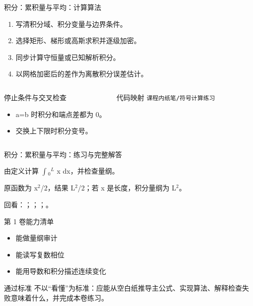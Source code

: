 \begin{frame}[t]{积分：累积量与平均：计算算法}
\footnotesize
{}\begin{enumerate}
\item 写清积分域、积分变量与边界条件。
\item 选择矩形、梯形或高斯求积并逐级加密。
\item 同步计算守恒量或已知解析积分。
\item 以网格加密后的差作为离散积分误差估计。
\end{enumerate}\begin{columns}[T,onlytextwidth]
\begin{block}{停止条件与交叉检查}\scriptsize\begin{itemize}
\item[\CheckMark] a=b 时积分和端点差都为 0。
\item[\CheckMark] 交换上下限时积分变号。
\end{itemize}\end{block}
\begin{block}{代码映射}
\scriptsize \texttt{课程内纸笔/\allowbreak{}符号计算练习}
\end{block}\end{columns}\end{frame}

\begin{frame}[t]{积分：累积量与平均：练习与完整解答}
\footnotesize
\begin{block}{}由定义计算 \ensuremath{\int}\ensuremath{_{0}}\ensuremath{^{L}} x dx，并检查量纲。\end{block}
\begin{exampleblock}{}原函数为 x\ensuremath{^{2}}/\allowbreak{}2，结果 L\ensuremath{^{2}}/\allowbreak{}2；若 x 是长度，积分量纲为 L\ensuremath{^{2}}。\end{exampleblock}
\vfill
\scriptsize 回看：；；；。
\end{frame}

\begin{frame}[t]{第 1 卷能力清单}
\small\begin{itemize}
\item[\CheckMark] 能做量纲审计
\item[\CheckMark] 能读写复数相位
\item[\CheckMark] 能用导数和积分描述连续变化
\end{itemize}\vfill\begin{block}{通过标准}
不以“看懂”为标准：应能从空白纸推导主公式、实现算法、解释检查失败意味着什么，并完成本卷练习。
\end{block}\end{frame}

